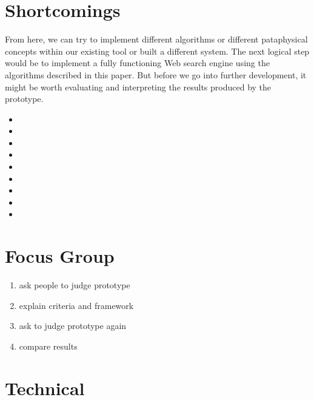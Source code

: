 \section{Shortcomings}

From here, we can try to implement different algorithms or different pataphysical concepts within our existing tool or built a different system. The next logical step would be to implement a fully functioning Web search engine using the algorithms described in this paper. But before we go into further development, it might be worth evaluating and interpreting the results produced by the prototype.

\begin{itemize}
  \item
  \item
  \item
  \item
  \item
  \item
  \item
  \item
  \item
\end{itemize}


\section{Focus Group}


\begin{enumerate}
  \item ask people to judge prototype
  \item explain criteria and framework
  \item ask to judge prototype again
  \item compare results
\end{enumerate}







\section{Technical}

